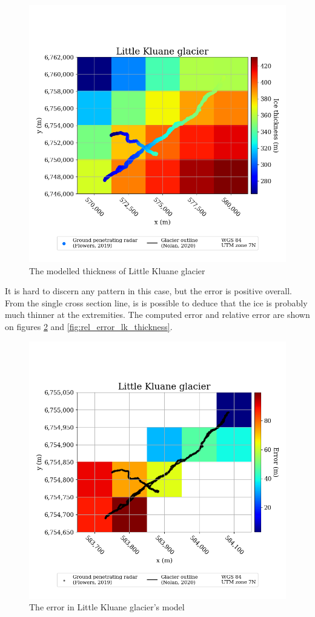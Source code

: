 \documentclass[a4, 12pt]{article}
\begin{document}
\begin{figure}[h!]
\centering
\includegraphics[scale=0.4]{../job_kluane_maps/Little Kluane glacier_cropped_thickness.png}
\caption{The modelled thickness of Little Kluane glacier}
\label{fig:cropped_lk_thickness}
\end{figure}
It is hard to discern any  pattern in this case, but the error is positive overall. From the single cross section line, is is possible to deduce that the ice is probably much thinner at the extremities. The computed error and relative error are shown on figures \ref{fig:error_lk_thickness} and \ref{fig:rel_error_lk_thickness}.
\begin{figure}[h!]
\centering
\includegraphics[scale=0.4]{../job_kluane_maps/Little Kluane glacier_error.png}
\caption{The error in Little Kluane glacier's model}
\label{fig:error_lk_thickness}
\end{figure}
\end{document}
